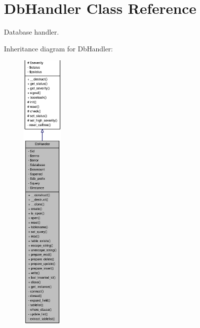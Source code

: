 \section{DbHandler Class Reference}
\label{classDbHandler}


Database handler.  




Inheritance diagram for DbHandler:\nopagebreak
\begin{figure}[H]
\begin{center}
\leavevmode
\includegraphics[height=400pt]{classDbHandler__inherit__graph}
\end{center}
\end{figure}


